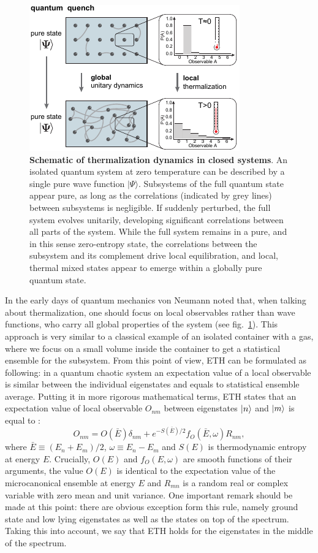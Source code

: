\begin{figure}[t]
	\centering
	\includegraphics[scale=1.5]{figures/ETH_fig1.pdf}
	\caption{{\bf Schematic of thermalization dynamics in closed systems}.  An isolated quantum system at zero temperature can be described by a single pure wave function $\vert \Psi \rangle$. Subsystems of the full quantum state appear pure, as long as the correlations (indicated by grey lines) between subsystems is negligible. If suddenly perturbed, the full system evolves unitarily, developing significant correlations between all parts of the system. While the full system remains in a pure, and in this sense zero-entropy state, the correlations between the subsystem and its complement drive local equilibration, and local, thermal mixed states appear to emerge within a globally pure quantum state.  }
	\label{fig:ETH_conceptual}
\end{figure}

In the early days of quantum mechanics von Neumann noted that, when talking about thermalization, one should focus on local observables rather than wave functions, who carry all global properties of the system (see fig.~\ref{fig:ETH_conceptual}). This approach is very similar to a classical example of an isolated container with a gas, where we focus on a small volume inside the container to get a statistical ensemble for the subsystem. From this point of view, ETH can be formulated as following: in a quantum chaotic system an expectation value of a local observable is similar between the individual eigenstates and equals to statistical ensemble average. Putting it in more rigorous mathematical terms, ETH states that an expectation value of local observable $O_{nm}$ between eigenstates $\left|n\right\rangle$ and $\left|m\right\rangle$ is equal to \cite{Srednicki1999}: 
\begin{equation}
O_{nm} = O(\bar{E}) \delta_{nm} + e^{-S(\bar{E})/2} f_O (\bar{E}, \omega) R_{nm},
\end{equation}
where $\bar{E} \equiv (E_n+E_m)/2$, $\omega \equiv E_n-E_m$ and $S(E)$ is thermodynamic entropy at energy $E$. Crucially, $O(E)$ and $f_O(E,\omega)$ are smooth functions of their arguments, the value $O(E)$ is identical to the expectation value of the microcanonical ensemble at energy $E$ and $R_{mn}$ is a random real or complex variable with zero mean and unit variance. One important remark should be made at this point: there are obvious exception form this rule, namely ground state and low lying eigenstates as well as the states on top of the spectrum. Taking this into account, we say that ETH holds for the eigenstates in the middle of the spectrum. 


